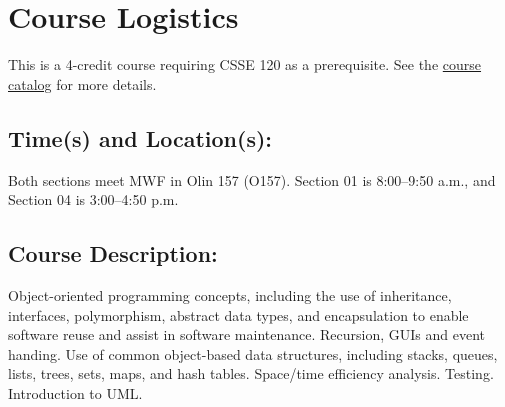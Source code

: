 \section*{Course Logistics}
This is a 4-credit course requiring CSSE 120 as a prerequisite. 
See the \href{https://catalog.rose-hulman.edu/course-search/?details&srcdb=2025&code=CSSE%20220}{course catalog} 
for more details. 

\subsection*{Time{(s)} and Location{(s)}:} 
Both sections meet MWF in Olin 157 (O157). 
Section 01 is 8:00--9:50 a.m., and 
Section 04 is 3:00--4:50 p.m. 

\subsection*{Course Description:} 
Object-oriented programming concepts, 
including the use of inheritance, interfaces, polymorphism, abstract data types,
and encapsulation to enable software reuse and assist in software maintenance. 
Recursion, GUIs and event handing. 
Use of common object-based data structures, 
including stacks, queues, lists, trees, sets, maps, and hash tables. 
Space/time efficiency analysis. Testing. Introduction to {UML}. 

